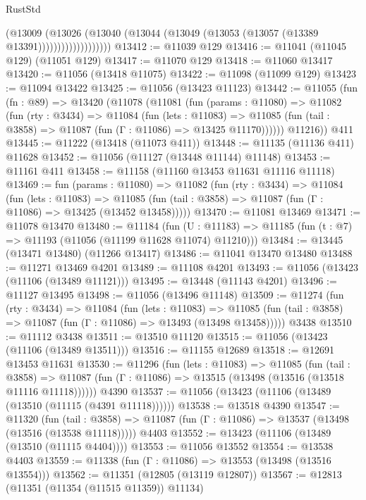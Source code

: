 \begin{lexlean}{RustStd}
\begin{coremodule}
                          (@13009
                            (@13026
                              (@13040
                                (@13044 (@13049 (@13053 (@13057 (@13389 @13391)))))))))))))))))))
@13412 := @11039 @129
@13416 := @11041 (@11045 @129) (@11051 @129)
@13417 := @11070 @129
@13418 := @11060 @13417
@13420 := @11056 (@13418 @11075)
@13422 := @11098 (@11099 @129)
@13423 := @11094 @13422
@13425 := @11056 (@13423 @11123)
@13442 := @11055
    (fun (fn : @89) =>
    @13420
      (@11078
        (@11081
          (fun (params : @11080) =>
          @11082
            (fun (rty : @3434) =>
            @11084
              (fun (lets : @11083) =>
              @11085 (fun (tail : @3858) => @11087 (fun (Γ : @11086) => @13425 @11170))))))
        @11216))
    @411
@13445 := @11222 (@13418 (@11073 @411))
@13448 := @11135 (@11136 @411) @11628
@13452 := @11056 (@11127 (@13448 @11144) @11148)
@13453 := @11161 @411
@13458 := @11158 (@11160 @13453 @11631 @11116 @11118)
@13469 := fun (params : @11080) =>
  @11082
    (fun (rty : @3434) =>
    @11084
      (fun (lets : @11083) =>
      @11085 (fun (tail : @3858) => @11087 (fun (Γ : @11086) => @13425 (@13452 @13458)))))
@13470 := @11081 @13469
@13471 := @11078 @13470
@13480 := @11184
    (fun (U : @11183) => @11185 (fun (t : @7) => @11193 (@11056 (@11199 @11628 @11074) @11210)))
@13484 := @13445 (@13471 @13480) (@11266 @13417)
@13486 := @11041 @13470 @13480
@13488 := @11271 @13469 @4201
@13489 := @11108 @4201
@13493 := @11056 (@13423 (@11106 (@13489 @11121)))
@13495 := @13448 (@11143 @4201)
@13496 := @11127 @13495
@13498 := @11056 (@13496 @11148)
@13509 := @11274
    (fun (rty : @3434) =>
    @11084
      (fun (lets : @11083) =>
      @11085 (fun (tail : @3858) => @11087 (fun (Γ : @11086) => @13493 (@13498 @13458)))))
    @3438
@13510 := @11112 @3438
@13511 := @13510 @11120
@13515 := @11056 (@13423 (@11106 (@13489 @13511)))
@13516 := @11155 @12689
@13518 := @12691 @13453 @11631
@13530 := @11296
    (fun (lets : @11083) =>
    @11085
      (fun (tail : @3858) =>
      @11087 (fun (Γ : @11086) => @13515 (@13498 (@13516 (@13518 @11116 @11118))))))
    @4390
@13537 := @11056 (@13423 (@11106 (@13489 (@13510 (@11115 (@4391 @11118))))))
@13538 := @13518 @4390
@13547 := @11320
    (fun (tail : @3858) => @11087 (fun (Γ : @11086) => @13537 (@13498 (@13516 (@13538 @11118)))))
    @4403
@13552 := @13423 (@11106 (@13489 (@13510 (@11115 @4404))))
@13553 := @11056 @13552
@13554 := @13538 @4403
@13559 := @11338 (fun (Γ : @11086) => @13553 (@13498 (@13516 @13554)))
@13562 := @11351 (@12805 (@13119 @12807))
@13567 := @12813 (@11351 (@11354 (@11515 @11359)) @11134)

\end{coremodule}
\end{lexlean}
